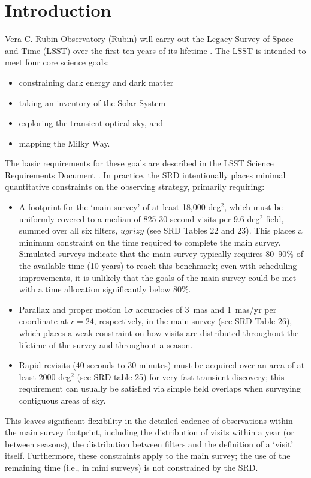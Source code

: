 \section{Introduction}

Vera C. Rubin Observatory (Rubin) will carry out the Legacy Survey of Space and Time (LSST) over the first ten years of its lifetime \citep{2019ApJ...873..111I}. The LSST is intended to meet four core science goals:
\begin{itemize}
\item constraining dark energy and dark matter
\item taking an inventory of the Solar System
\item exploring the transient optical sky, and
\item mapping the Milky Way.
\end{itemize}

The basic requirements for these goals are described in the LSST Science Requirements Document \citep[SRD;][]{LPM-17}. In practice, the SRD intentionally places minimal quantitative constraints
on the observing strategy, primarily requiring:
\begin{itemize}
\item A footprint for the `main survey' of at least 18,000 deg$^2$, which must be uniformly covered to
a median of 825 30-second visits per 9.6 deg$^2$ field, summed over all six filters, $ugrizy$ (see SRD
Tables 22 and 23). This places a minimum constraint on the time required to complete
the main survey. Simulated surveys indicate that the main survey typically requires 80--90\%
of the available time (10 years) to reach this benchmark; even with scheduling improvements, it is unlikely
that the goals of the main survey could be met with a time allocation significantly below 80\%.
\item Parallax and proper motion $1\sigma$ accuracies of 3~mas and 1~mas/yr per coordinate at $r=24$,
respectively, in the main survey (see SRD Table 26), which places
a weak constraint on how visits are distributed throughout the lifetime of the survey and throughout a season.
\item Rapid revisits (40 seconds to 30 minutes) must be acquired over an area of at least 2000 deg$^2$ (see SRD table 25) for
very fast transient discovery; this requirement can usually be satisfied via simple field overlaps when surveying contiguous areas of sky.
\end{itemize}
This leaves significant flexibility in the detailed cadence of observations within
the main survey footprint, including the distribution of visits within a year (or between seasons), the distribution between filters and
the definition of a `visit' itself. Furthermore, these constraints apply to the main survey; the use of the
remaining time (i.e., in mini surveys) is not constrained by the SRD.

